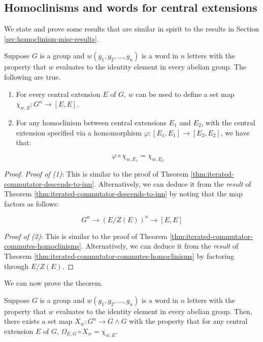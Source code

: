 \subsection{Homoclinisms and words for central extensions}\label{sec:homoclinisms-words-central-extensions}

We state and prove some results that are similar in spirit to the
results in Section \ref{sec:homoclinism-misc-results}.

\begin{lemma}\label{lemma:iterated-commutator-descends-extension-version}
  Suppose $G$ is a group and $w(g_1,g_2,\dots,g_n)$ is a word in $n$
  letters with the property that $w$ evaluates to the identity element
  in every abelian group. The following are true.

  \begin{enumerate}
  \item For every central extension $E$ of $G$, $w$ can be used to
    define a set map $\chi_{w,E}: G^n \to [E,E]$.
  \item For any homoclinism between central extensions $E_1$ and
    $E_2$, with the central extension specified via a homomorphism
    $\varphi:[E_1,E_1] \to [E_2,E_2]$, we have that:

    $$\varphi \circ \chi_{w,E_1} = \chi_{w,E_2}$$
  \end{enumerate}
\end{lemma}


\begin{proof}
  {\em Proof of (1)}: This is similar to the proof of Theorem
  \ref{thm:iterated-commutator-descends-to-inn}. Alternatively, we can
  deduce it from the {\em result} of Theorem
  \ref{thm:iterated-commutator-descends-to-inn} by noting that the
  map factors as follows:

  $$G^n \to (E/Z(E))^n \to [E,E]$$

  {\em Proof of (2)}: This is similar to the proof of Theorem
  \ref{thm:iterated-commutator-commutes-homoclinisms}. Alternatively,
  we can deduce it from the {\em result} of Theorem
  \ref{thm:iterated-commutator-commutes-homoclinisms} by factoring
  through $E/Z(E)$.
\end{proof}

We can now prove the theorem.

\begin{theorem}\label{thm:iterated-commutator-map-to-exteriorsquare}
  Suppose $G$ is a group and $w(g_1,g_2,\dots,g_n)$ is a word in $n$
  letters with the property that $w$ evaluates to the identity element
  in every abelian group. Then, there exists a set map $X_w:G^n \to G
  \wedge G$ with the property that for any central extension $E$ of
  $G$, $\Omega_{E,G} \circ X_w = \chi_{w,E}$.
\end{theorem}

